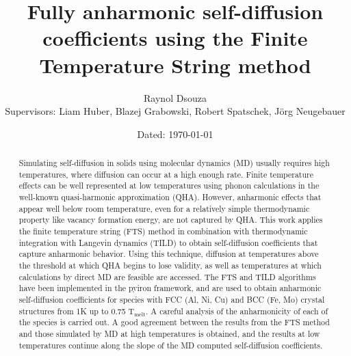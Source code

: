 \documentclass{article}
\title{Fully anharmonic self-diffusion coefficients using the Finite Temperature String method}
\date{\small Dated: \today}
\author{Raynol Dsouza\\[0.5cm] {Supervisors: Liam Huber, Blazej Grabowski, Robert Spatschek, Jörg Neugebauer}}
\affil{Max Planck Institut für Eisenforschung, Düsseldorf}
\begin{document}
\maketitle
{}

\newpage
\begin{abstract}
\normalsize
Simulating self-diffusion in solids using molecular dynamics (MD) usually requires high temperatures, where diffusion can occur at a high enough rate. Finite temperature effects can be well represented at low temperatures using phonon calculations in the well-known quasi-harmonic approximation (QHA). However, anharmonic effects that appear well below room temperature, even for a relatively simple thermodynamic property like vacancy formation energy, are not captured by QHA. This work applies the finite temperature string (FTS) method in combination with thermodynamic integration with Langevin dynamics (TILD) to obtain self-diffusion coefficients that capture anharmonic behavior. Using this technique, diffusion at temperatures above the threshold at which QHA begins to lose validity, as well as temperatures at which calculations by direct MD are feasible are accessed. The FTS and TILD algorithms have been implemented in the pyiron framework, and are used to obtain anharmonic self-diffusion coefficients for species with FCC (Al, Ni, Cu) and BCC (Fe, Mo) crystal structures from 1K up to 0.75 $\mathrm{T_{melt}}$. A careful analysis of the anharmonicity of each of the species is carried out. A good agreement between the results from the FTS method and those simulated by MD at high temperatures is obtained, and the results at low temperatures continue along the slope of the MD computed self-diffusion coefficients. 
\end{abstract}
\end{document}
